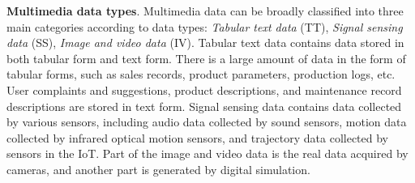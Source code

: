 \documentclass[a4paper,fleqn]{cas-dc}
\begin{document}
\textbf{Multimedia data types}. Multimedia data can be broadly classified into three main categories according to data types: \textit{Tabular text data} (TT), \textit{Signal sensing data} (SS), \textit{Image and video data} (IV).
Tabular text data contains data stored in both tabular form and text form.
There is a large amount of data in the form of tabular forms, such as sales records, product parameters, production logs, etc. User complaints and suggestions, product descriptions, and maintenance record descriptions are stored in text form.
Signal sensing data contains data collected by various sensors, including audio data collected by sound sensors, motion data collected by infrared optical motion sensors, and trajectory data collected by sensors in the IoT.
Part of the image and video data is the real data acquired by cameras, and another part is generated by digital simulation.
\end{document}
